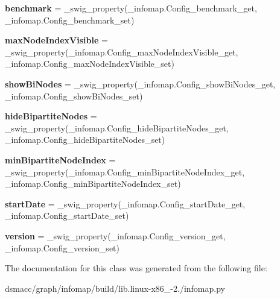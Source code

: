 \begin{DoxyCompactItemize}
{\bfseries benchmark} = \+\_\+swig\+\_\+property(\+\_\+infomap.\+Config\+\_\+benchmark\+\_\+get, \+\_\+infomap.\+Config\+\_\+benchmark\+\_\+set)
\item 
\mbox{\label{classinfomap_1_1Config_a25af91ca5586e65cbdf81f2811dab37a}} 
{\bfseries max\+Node\+Index\+Visible} = \+\_\+swig\+\_\+property(\+\_\+infomap.\+Config\+\_\+max\+Node\+Index\+Visible\+\_\+get, \+\_\+infomap.\+Config\+\_\+max\+Node\+Index\+Visible\+\_\+set)
\item 
\mbox{\label{classinfomap_1_1Config_a8c389829a41fc3701e72bef62c03bd79}} 
{\bfseries show\+Bi\+Nodes} = \+\_\+swig\+\_\+property(\+\_\+infomap.\+Config\+\_\+show\+Bi\+Nodes\+\_\+get, \+\_\+infomap.\+Config\+\_\+show\+Bi\+Nodes\+\_\+set)
\item 
\mbox{\label{classinfomap_1_1Config_a84c414c98a94d33d016b80071c8d44bb}} 
{\bfseries hide\+Bipartite\+Nodes} = \+\_\+swig\+\_\+property(\+\_\+infomap.\+Config\+\_\+hide\+Bipartite\+Nodes\+\_\+get, \+\_\+infomap.\+Config\+\_\+hide\+Bipartite\+Nodes\+\_\+set)
\item 
\mbox{\label{classinfomap_1_1Config_ad19d69057ae47cb83f44483bede0923c}} 
{\bfseries min\+Bipartite\+Node\+Index} = \+\_\+swig\+\_\+property(\+\_\+infomap.\+Config\+\_\+min\+Bipartite\+Node\+Index\+\_\+get, \+\_\+infomap.\+Config\+\_\+min\+Bipartite\+Node\+Index\+\_\+set)
\item 
\mbox{\label{classinfomap_1_1Config_ab813b857d4ef74e09bb983847cff0786}} 
{\bfseries start\+Date} = \+\_\+swig\+\_\+property(\+\_\+infomap.\+Config\+\_\+start\+Date\+\_\+get, \+\_\+infomap.\+Config\+\_\+start\+Date\+\_\+set)
\item 
\mbox{\label{classinfomap_1_1Config_a8d2971639e5360778280a450d873d723}} 
{\bfseries version} = \+\_\+swig\+\_\+property(\+\_\+infomap.\+Config\+\_\+version\+\_\+get, \+\_\+infomap.\+Config\+\_\+version\+\_\+set)
\end{DoxyCompactItemize}


The documentation for this class was generated from the following file\+:\begin{DoxyCompactItemize}
\item 
dsmacc/graph/infomap/build/lib.\+linux-\/x86\+\_-\/2./infomap.\+py\end{DoxyCompactItemize}
